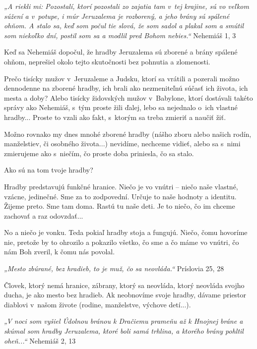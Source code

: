 


{\it „A riekli mi: Pozostalí, ktorí pozostali zo zajatia tam v~tej krajine, sú vo veľkom súžení a v~potupe, i múr Jeruzalema je rozborený, a jeho brány sú spálené ohňom. A stalo sa, keď som počul tie slová, že som sadol a plakal som a smútil som niekoľko dní, postil som sa a modlil pred Bohom nebies.“} Nehemiáš 1, 3

Keď sa Nehemiáš dopočul, že hradby Jeruzalema sú zborené a brány spálené ohňom, neprešiel okolo tejto skutočnosti bez pohnutia a zlomenosti.

Prečo tisícky mužov v~Jeruzaleme a Judsku, ktorí sa vrátili a pozerali možno dennodenne na zborené hradby, ich brali ako nezmeniteľnú súčasť ich života, ich mesta a doby? Alebo tisícky židovských mužov v~Babylone, ktorí dostávali takéto správy ako Nehemiáš, s~tým proste žili ďalej, lebo sa nejednalo o~ich vlastné hradby... Proste to vzali ako fakt, s~ktorým sa treba zmieriť a naučiť žiť.

Možno rovnako my dnes mnohé zborené hradby (nášho zboru alebo našich rodín, manželstiev, či osobného života...) nevidíme, nechceme vidieť, alebo sa s~nimi zmierujeme ako s~niečím, čo proste doba priniesla, čo sa stalo.

Ako sú na tom tvoje hradby?

Hradby predstavujú funkčné hranice. Niečo je vo vnútri – niečo naše vlastné, vzácne, jedinečné. Sme za to zodpovední. Určuje to naše hodnoty a identitu. Žijeme preto. Sme tam doma. Rastú tu naše deti. Je to niečo, čo im chceme zachovať a raz odovzdať...

No a niečo je vonku. Teda pokiaľ hradby stoja a fungujú. Niečo, čomu hovoríme nie, pretože by to ohrozilo a pokazilo všetko, čo sme a čo máme vo vnútri, čo nám Boh zveril, k čomu nás povolal.

{\it „Mesto zbúrané, bez hradieb, to je muž, čo sa neovláda.“} 	Príslovia 25, 28

Človek, ktorý nemá hranice, zábrany, ktorý sa neovláda, ktorý neovláda svojho ducha, je ako mesto bez hradieb. Ak neobnovíme svoje hradby, dávame priestor diablovi v~našom živote (rodine, manželstve, výchove detí...).

{\it „V noci som vyšiel Údolnou bránou k Dračiemu prameňu až k Hnojnej bráne a skúmal som hradby Jeruzalema, ktoré boli samá trhlina, a ktorého brány pohltil oheň...“} Nehemiáš 2, 13

